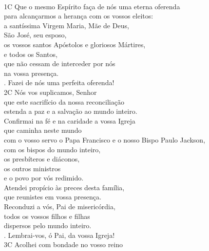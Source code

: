 \documentclass{book}
\begin{document}
\begin{flushleft}
    \vspace{.2cm} \\
    {\color{VioletRed2}1C} Que o mesmo Espírito faça de nós uma eterna oferenda \\
    para alcançarmos a herança com os vossos eleitos: \\
    a santíssima Virgem Maria, Mãe de Deus, \\
    São José, seu esposo, \\
    os vossos santos Apóstolos e gloriosos Mártires, \\
    e todos os Santos, \\
    que não cessam de interceder por nós \\
    na vossa presença.
    \vspace{.2cm} \\
    {\color{VioletRed2} \Rbar.} Fazei de nós uma perfeita oferenda!
    \vspace{.2cm} \\
    {\color{VioletRed2}2C} Nós vos suplicamos, Senhor \\
    que este sacrifício da nossa reconciliação \\
    estenda a paz e a salvação ao mundo inteiro. \\
    Confirmai na fé e na caridade a vossa Igreja \\
    que caminha neste mundo \\
    com o vosso servo o Papa Francisco e o nosso Bispo Paulo Jackson, \\
    com os bispos do mundo inteiro, \\
    os presbíteros e diáconos, \\
    os outros ministros \\
    e o povo por vós redimido.
    \vspace{.2cm} \\
    Atendei propício às preces desta família, \\
    que reunistes em vossa presença. \\
    Reconduzi a vós, Pai de misericórdia, \\
    todos os vossos filhos e filhas \\
    dispersos pelo mundo inteiro.
    \vspace{.2cm} \\
    {\color{VioletRed2} \Rbar.} Lembrai-vos, ó Pai, da vossa Igreja!
    \vspace{.2cm} \\
    {\color{VioletRed2}3C} Acolhei com bondade no vosso reino \\

\end{flushleft}
\end{document}
